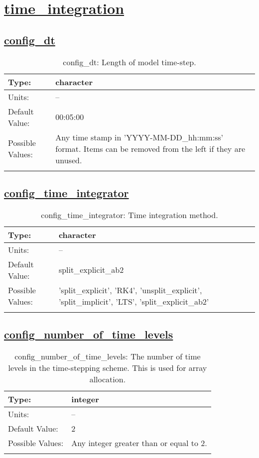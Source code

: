 \section[time\_integration]{\hyperref[sec:nm_tab_time_integration]{time\_integration}}
\label{sec:nm_sec_time_integration}
\subsection[config\_dt]{\hyperref[sec:nm_tab_time_integration]{config\_dt}}
\label{subsec:nm_sec_config_dt}
\begin{center}
\begin{longtable}{| p{2.0in} || p{4.0in} |}
    \hline
    Type: & character \\
    \hline
    Units: & -- \\
    \hline
    Default Value: & 00:05:00 \\
    \hline
    Possible Values: & Any time stamp in 'YYYY-MM-DD\_hh:mm:ss' format. Items can be removed from the left if they are unused. \\
    \hline
    \caption{config\_dt: Length of model time-step.}
\end{longtable}
\end{center}
\subsection[config\_time\_integrator]{\hyperref[sec:nm_tab_time_integration]{config\_time\_integrator}}
\label{subsec:nm_sec_config_time_integrator}
\begin{center}
\begin{longtable}{| p{2.0in} || p{4.0in} |}
    \hline
    Type: & character \\
    \hline
    Units: & -- \\
    \hline
    Default Value: & split\_explicit\_ab2 \\
    \hline
    Possible Values: & 'split\_explicit', 'RK4', 'unsplit\_explicit', 'split\_implicit', 'LTS', 'split\_explicit\_ab2' \\
    \hline
    \caption{config\_time\_integrator: Time integration method.}
\end{longtable}
\end{center}
\subsection[config\_number\_of\_time\_levels]{\hyperref[sec:nm_tab_time_integration]{config\_number\_of\_time\_levels}}
\label{subsec:nm_sec_config_number_of_time_levels}
\begin{center}
\begin{longtable}{| p{2.0in} || p{4.0in} |}
    \hline
    Type: & integer \\
    \hline
    Units: & -- \\
    \hline
    Default Value: & 2 \\
    \hline
    Possible Values: & Any integer greater than or equal to 2. \\
    \hline
    \caption{config\_number\_of\_time\_levels: The number of time levels in the time-stepping scheme. This is used for array allocation.}
\end{longtable}
\end{center}
